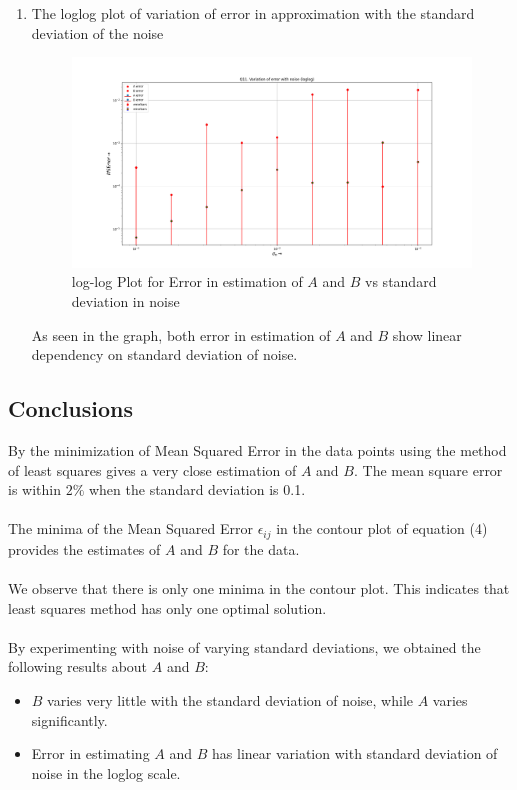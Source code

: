 \documentclass[12pt, a4paper]{report}
\begin{document}
\begin{enumerate}
\item The loglog plot of variation of error in approximation with the standard deviation of the noise
\begin{figure}[H]
	\includegraphics[scale=0.35]{Figure_11.png}
	\caption{log-log Plot for Error in estimation of $A$ and $B$ vs standard deviation in noise}
	\label{fig:logplota}
\end{figure}
As seen in the graph, both error in estimation of $A$ and $B$ show linear dependency on standard deviation of noise.
\end{enumerate}

\subsection*{Conclusions}
By the minimization of Mean Squared Error in the data points using the method of least squares gives a very close estimation of $A$ and $B$. The mean square error is within $2\%$ when the standard deviation is 0.1.\\ \\
The minima of the Mean Squared Error $\epsilon_{ij}$ in the contour plot of equation (4) provides the estimates of $A$ and $B$ for the data.\\ \\
We observe that there is only one minima in the contour plot. This indicates that least squares method has only one optimal solution.\\ \\
By experimenting with noise of varying standard deviations, we obtained the following results about $A$ and $B$:
\begin{itemize}
    \item $B$ varies very little with the standard deviation of noise, while $A$ varies significantly.\\
\item Error in estimating $A$ and $B$ has linear variation with standard deviation of noise in the loglog scale.
\end{itemize}
\end{document}
